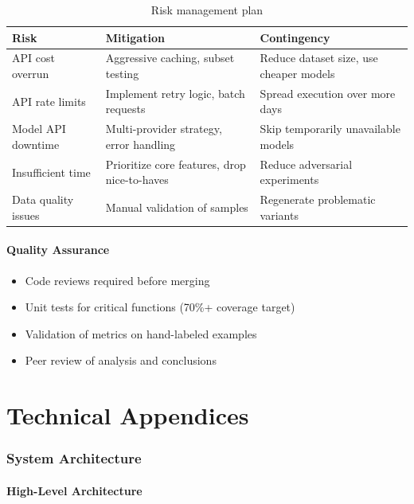 \documentclass[11pt,a4paper]{article}
\begin{document}
\begin{table}[h]
\centering
\small
\begin{tabular}{@{}p{3cm}p{5cm}p{5cm}@{}}
\toprule
\textbf{Risk} & \textbf{Mitigation} & \textbf{Contingency} \\ \midrule
API cost overrun & Aggressive caching, subset testing & Reduce dataset size, use cheaper models \\
API rate limits & Implement retry logic, batch requests & Spread execution over more days \\
Model API downtime & Multi-provider strategy, error handling & Skip temporarily unavailable models \\
Insufficient time & Prioritize core features, drop nice-to-haves & Reduce adversarial experiments \\
Data quality issues & Manual validation of samples & Regenerate problematic variants \\ \bottomrule
\end{tabular}
\caption{Risk management plan}
\end{table}

\subsection{Quality Assurance}

\begin{itemize}[leftmargin=*]
    \item Code reviews required before merging
    \item Unit tests for critical functions (70\%+ coverage target)
    \item Validation of metrics on hand-labeled examples
    \item Peer review of analysis and conclusions
\end{itemize}

\newpage

\part{Technical Appendices}

\section{System Architecture}

\subsection{High-Level Architecture}
\end{document}
